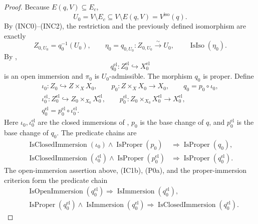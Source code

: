 \begin{proof}
  Because $E(q,V)\subseteq E_c$,
  \[
    U_0=V\setminus E_c
      \subseteq V\setminus E(q,V)=V^{\mathrm{iso}}(q).
  \]
  By (INC0)--(INC2), the restriction and the previously defined isomorphism
  are exactly
  \[
    Z_{0,U_0}=q_0^{-1}(U_0),
    \qquad
    \eta_0=q_{0,U_0}\colon Z_{0,U_0}\xrightarrow{\sim}U_0,
    \qquad
    \operatorname{IsIso}(\eta_0).
  \]
  By ,
  \[
    q_0^{\mathrm{el}}\colon Z_0^{\mathrm{el}}
      \hookrightarrow X_0^{\mathrm{el}}
  \]
  is an open immersion and $\pi_0$ is $U_0$-admissible.  The morphism $q_0$
  is proper.  Define
  \[
  \begin{gathered}
    \iota_0\colon Z_0\hookrightarrow Z\times_XX_0,\qquad
    p_0\colon Z\times_XX_0\to X_0,\qquad
    q_0=p_0\circ\iota_0,\\
    \iota_0^{\mathrm{el}}\colon Z_0^{\mathrm{el}}\hookrightarrow
      Z_0\times_{X_0}X_0^{\mathrm{el}},\qquad
    p_0^{\mathrm{el}}\colon
      Z_0\times_{X_0}X_0^{\mathrm{el}}\to X_0^{\mathrm{el}},\\
    q_0^{\mathrm{el}}
      =p_0^{\mathrm{el}}\circ\iota_0^{\mathrm{el}}.
  \end{gathered}                                                   \tag{IC1a}
  \]
  Here \(\iota_0,\iota_0^{\mathrm{el}}\) are the closed immersions of
  , \(p_0\) is the base change of \(q\),
  and \(p_0^{\mathrm{el}}\) is the base change of \(q_0\).  The predicate
  chains are
  \[
  \begin{aligned}
    \operatorname{IsClosedImmersion}(\iota_0)
      \wedge\operatorname{IsProper}(p_0)
      &\Longrightarrow\operatorname{IsProper}(q_0),\\
    \operatorname{IsClosedImmersion}(\iota_0^{\mathrm{el}})
      \wedge\operatorname{IsProper}(p_0^{\mathrm{el}})
      &\Longrightarrow\operatorname{IsProper}(q_0^{\mathrm{el}}).
  \end{aligned}                                                    \tag{IC1b}
  \]
  The open-immersion assertion above, (IC1b), (P0a), and the
  proper-immersion criterion
  \cite[\href{https://stacks.math.columbia.edu/tag/01IQ}{Tag 01IQ}]
  {stacks-project} form the predicate chain
  \[
  \begin{aligned}
    &\operatorname{IsOpenImmersion}(q_0^{\mathrm{el}})
      \Longrightarrow\operatorname{IsImmersion}(q_0^{\mathrm{el}}),\\
    &\operatorname{IsProper}(q_0^{\mathrm{el}})
      \wedge\operatorname{IsImmersion}(q_0^{\mathrm{el}})
      \Longrightarrow\operatorname{IsClosedImmersion}(q_0^{\mathrm{el}}).

\end{aligned}\]
\end{proof}
